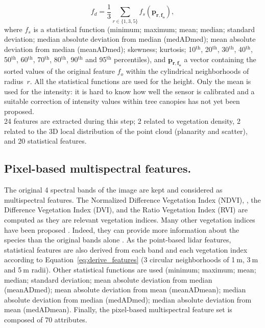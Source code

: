 \begin{equation}
f_{d} = \frac{1}{3}\sum_{r \in \{1,3,5\}}f_{s}(\mathbf{p_{r,f_{o}}}), 
\label{eq:derive_features}
\end{equation}
where $f_{s}$ is a statistical function (minimum; maximum; mean; median; standard deviation; median absolute deviation from median (medADmed); mean absolute deviation from median (meanADmed); skewness; kurtosis; 10$^{\text{th}}$, 20$^{\text{th}}$, 30$^{\text{th}}$, 40$^{\text{th}}$, 50$^{\text{th}}$, 60$^{\text{th}}$, 70$^{\text{th}}$, 80$^{\text{th}}$, 90$^{\text{th}}$ and 95$^{\text{th}}$ percentiles), and $\mathbf{p_{r,f_{o}}}$ a vector containing the sorted values of the original feature $f_{o}$ within the cylindrical neighborhoods of radius~$r$. All the statistical functions are used for the height. Only the mean is used for the intensity: it is hard to know how well the sensor is calibrated and a suitable correction of intensity values within tree canopies has not yet been proposed. \\
24 features are extracted during this step; 2 related to vegetation density, 2 related to the 3D local distribution of the point cloud (planarity and scatter), and 20 statistical features.

\subsection{Pixel-based multispectral features.}
The original 4 spectral bands of the image are kept and considered as multispectral features. The Normalized Difference Vegetation Index (NDVI), \citep{tucker1979red},
the Difference Vegetation Index (DVI), \citep{bacour2006normalization}
and the Ratio Vegetation Index (RVI) \citep{jordan1969derivation}
are computed as they are relevant vegetation indices. Many other vegetation indices have been proposed \citep{bannari1995review}. Indeed, they can provide more information about the species than the original bands alone \citep{zargar2011review}. As the point-based lidar features, statistical features are also derived from each band and each vegetation index according to Equation~\ref{eq:derive_features} (3 circular neighborhoods of 1$\:$m, 3$\:$m and 5$\:$m radii). Other statistical functions are used (minimum; maximum; mean; median; standard deviation; mean absolute deviation from median (meanADmed); mean absolute deviation from mean (meanADmean); median absolute deviation from median (medADmed); median absolute deviation from mean (medADmean). Finally, the pixel-based multispectral feature set is composed of 70 attributes.

